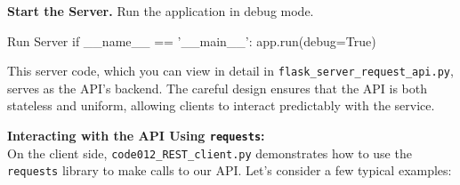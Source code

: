 {\bf Start the Server.} Run the application in debug mode.

\begin{codeonly}{Run Server}
if __name__ == '__main__':
    app.run(debug=True)
\end{codeonly}

This server code, which you can view in detail in \texttt{flask\_server\_request\_api.py}, serves as the API’s backend. The careful design ensures that the API is both stateless and uniform, allowing clients to interact predictably with the service.

\bigskip
\textbf{Interacting with the API Using \texttt{requests}:}\\
On the client side, \texttt{code012\_REST\_client.py} demonstrates how to use the \texttt{requests} library to make calls to our API. Let’s consider a few typical examples:

